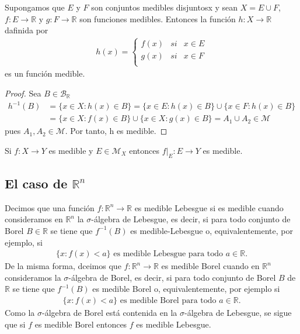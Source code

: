 \begin{prop}
    Supongamos que $E$ y $F$ son conjuntos medibles disjuntosx y sean $X = E \cup F$, $f: E \longrightarrow \mathbb{R}$ y $g: F \longrightarrow \mathbb{R}$ son funciones medibles. Entonces la función $h: X \longrightarrow \mathbb{R}$ dafinida por
    \begin{align*}
        h(x) =  \left\{ \begin{array}{lcc}
                            f(x) & si & x \in E \\
                            g(x) & si & x \in F \\
                        \end{array}
        \right.
    \end{align*}
    es un función medible.
\end{prop}
\begin{proof}
    Sea $B \in \mathcal{B}_{\mathbb{R}}$
    \begin{align*}
        h^{-1}(B) & = \{ x \in X : h(x)  \in B\} = \{ x \in E : h(x) \in B\} \cup \{ x \in F : h(x) \in B\}   \\
                  & = \{ x \in X : f(x) \in B\} \cup \{ x \in X : g(x) \in B\} = A_1 \cup A_2 \in \mathcal{M}
    \end{align*}
    pues $A_1, A_2 \in \mathcal{M}$. Por tanto, h es medible.
\end{proof}
\begin{obs}
    Si $f: X \longrightarrow Y$ es medible y $E \in \mathcal{M}_X$ entonces $f|_E: E \longrightarrow Y$ es medible.
\end{obs}
\subsection{El caso de $\mathbb{R}^n$}
\begin{defi}
    Decimos que una función $f: \mathbb{R}^n \longrightarrow \mathbb{R}$ es medible Lebesgue si es medible cuando consideramos en $\mathbb{R}^n$ la $\sigma$-álgebra de Lebesgue, es decir, si para todo conjunto de Borel $B \in \mathbb{R}$ se tiene que $f^{-1}(B)$ es medible-Lebesgue o, equivalentemente, por ejemplo, si
    \begin{align*}
        \{ x : f(x) < a \} \text{ es medible Lebesgue para todo } a \in \mathbb{R}.
    \end{align*}
    De la misma forma, dceimos que  $f: \mathbb{R}^n \longrightarrow \mathbb{R}$ es medible Borel cuando en $\mathbb{R}^n$ consideramos la $\sigma$-álgebra de Borel, es decir, si para todo conjunto de Borel $B$ de $\mathbb{R}$ se tiene que $f^{-1}(B)$ es medible Borel o, equivalentemente, por ejemplo si
    \begin{align*}
        \{ x : f(x) < a \} \text{ es medible Borel para todo } a \in \mathbb{R}.
    \end{align*}
    Como la  $\sigma$-álgebra de Borel está contenida en la  $\sigma$-álgebra de Lebesgue, se sigue que si $f$ es medible Borel entonces $f$ es medible Lebesgue.
\end{defi}

